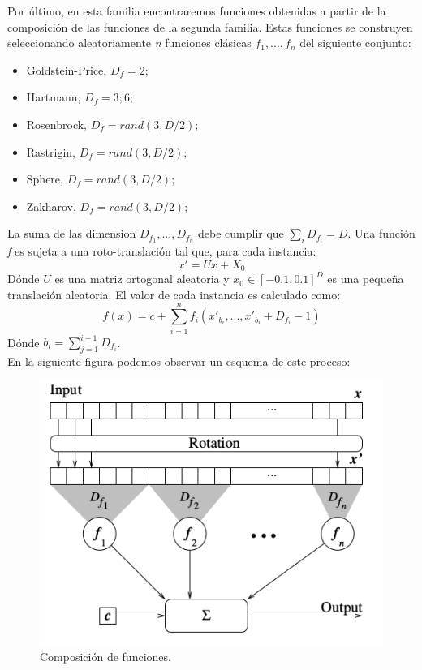 Por último, en esta familia encontraremos funciones obtenidas a partir de la composición de las funciones de la segunda familia. Estas funciones se construyen seleccionando aleatoriamente \textit{n} funciones clásicas $f_{1},...,f_{n}$ del siguiente conjunto: 
    	  \begin{itemize}
    	  	\item Goldstein-Price, $D_{f} = 2$;
    	  	\item Hartmann, $D_{f} = 3; 6;$
    	  	\item Rosenbrock, $D_{f} = rand(3, D/2);$
    	  	\item Rastrigin, $D_{f} = rand(3, D/2);$
    	  	\item Sphere, $D_{f} = rand(3, D/2);$
    	  	\item Zakharov, $D_{f} = rand(3, D/2);$
    	  \end{itemize}
    La suma de las dimension $D_{f_{1}},...,D_{f_{n}}$ debe cumplir que $\sum_{i}{D_{f_{i}}} = D$.
    \bigskip
    Una función \textit{f} es sujeta a una roto-translación tal que, para cada instancia: 
    \begin{equation}
    	x' = Ux + X_{0}
    \end{equation}
    Dónde $U$ es una matriz ortogonal aleatoria y $x_{0}\in[-0.1, 0.1]^{D}$ es una pequeña translación aleatoria. El valor de cada instancia es calculado como: 
    \begin{equation}
    	f(x) = c + \sum^{n}_{i=1}{f_{i}(x'_{b_{i}},...,x'_{b_{i}} + D_{f_{i}} - 1)}
    \end{equation}
    Dónde $b_{i} = \sum^{i-1}_{j=1}{D_{f_{i}}}$. \\
    En la siguiente figura podemos observar un esquema de este proceso: 
    	  \begin{figure}[!ht]
  				\centering
					\includegraphics[scale=0.5]{images/composicion}
  				\caption{Composición de funciones.}
				\end{figure}

